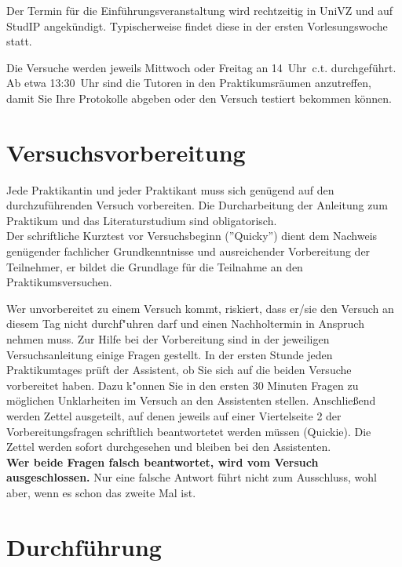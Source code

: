 Der Termin für die Einführungsveranstaltung wird rechtzeitig in UniVZ und auf StudIP angekündigt. Typischerweise findet diese in der ersten Vorlesungswoche statt.

Die Versuche werden jeweils Mittwoch oder Freitag an 14~Uhr~c.t. durchgeführt. Ab etwa 13:30~Uhr sind die Tutoren in den Praktikumsräumen anzutreffen, damit Sie Ihre Protokolle abgeben oder den Versuch testiert bekommen können. 

\section{Versuchsvorbereitung}

Jede Praktikantin und jeder Praktikant muss sich genügend auf den durchzuführenden Versuch vorbereiten. Die Durcharbeitung der Anleitung zum Praktikum und das Literaturstudium sind obligatorisch. \\
Der schriftliche Kurztest vor Versuchsbeginn (''Quicky'') dient dem Nachweis genügender fachlicher Grundkenntnisse und ausreichender Vorbereitung der Teilnehmer, er bildet die Grundlage für die Teilnahme an den Praktikumsversuchen.

Wer unvorbereitet zu einem Versuch kommt, riskiert, dass er/sie den Versuch an diesem Tag nicht durchf"uhren darf und einen Nachholtermin in Anspruch nehmen muss. Zur Hilfe bei der Vorbereitung sind in der jeweiligen Versuchsanleitung einige Fragen gestellt. 
In der ersten Stunde jeden Praktikumtages prüft der Assistent, ob Sie sich auf die beiden Versuche vorbereitet haben. Dazu k"onnen Sie in den ersten 30 Minuten Fragen zu möglichen Unklarheiten im Versuch an den Assistenten stellen. Anschließend werden Zettel ausgeteilt, auf denen jeweils auf einer Viertelseite 2 der Vorbereitungsfragen schriftlich beantwortetet werden müssen (Quickie). Die Zettel werden sofort durchgesehen und bleiben bei den Assistenten.\\ 
\textbf{Wer beide Fragen falsch beantwortet, wird vom Versuch ausgeschlossen.} Nur eine falsche Antwort führt nicht zum Ausschluss, wohl aber, wenn es schon das zweite Mal ist. 


\section{Durchführung}

